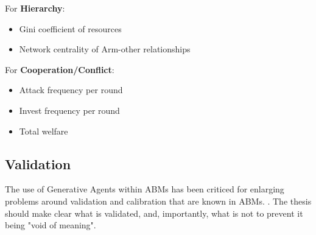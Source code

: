 For \textbf{Hierarchy}:
\begin{itemize}
    \item Gini coefficient of resources
    \item Network centrality of Arm-other relationships
\end{itemize}

For \textbf{Cooperation/Conflict}:
\begin{itemize}
    \item Attack frequency per round
    \item Invest frequency per round
    \item Total welfare
\end{itemize}

%
%
%
%

\subsection{Validation}
%
%

The use of Generative Agents within ABMs has been criticed for enlarging problems around validation and calibration that are known in ABMs. \cite{larooij2025}. The thesis should make clear what is validated, and, importantly, what is not to prevent it being "void of meaning".

